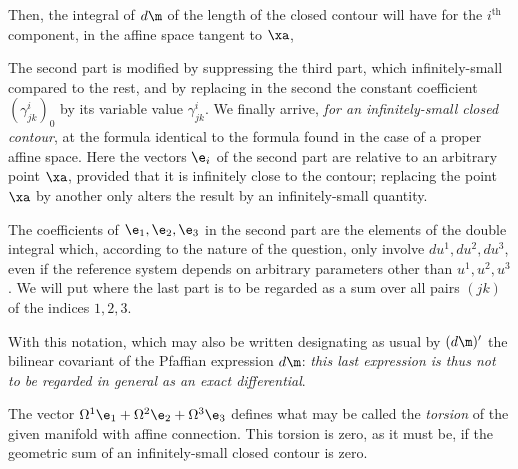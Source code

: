Then, the integral of $d\m$ of the length of the closed contour will have for the $i^\text{th}$ component, in the affine space tangent to $\xa$,

The second part is modified by suppressing the third part, which infinitely-small compared to the rest, and by replacing in the second the constant coefficient $(\gamma_{jk}^i)_0$ by its variable value $\gamma_{jk}^i$. We finally arrive, \textit{for an infinitely-small closed contour}, at the formula
identical to the formula found in the case of a proper affine space. Here the vectors $\e_i$ of the second part are relative to an arbitrary point $\xa$, provided that it is infinitely close to the contour; replacing the point $\xa$ by another only alters the result by an infinitely-small quantity.

The coefficients of $\e_1, \e_2, \e_3$ in the second part are the elements of the double integral which, according to the nature of the question, only involve $du^1, du^2, du^3$, even if the reference system depends on arbitrary parameters other than $u^1, u^2, u^3$. We will put
where the last part is to be regarded as a sum over all pairs $(jk)$ of the indices $1,2,3$.

With this notation,
which may also be written
designating as usual by $(d\m)'$ the bilinear covariant of the Pfaffian expression $d\m$: \textit{this last expression is thus not to be regarded in general as an exact differential}.

The vector $\Omega^1 \e_1 + \Omega^2 \e_2 + \Omega^3 \e_3$ defines what may be called the \textit{torsion} of the given manifold with affine connection. This torsion is zero, as it must be, if the geometric sum of an infinitely-small closed contour is zero.
%